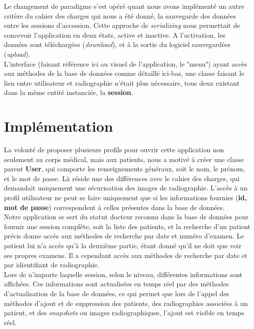 \documentclass[12pt,a4paper]{article}
\begin{document}
\begin{multicols}{2}
Le changement de paradigme s'est opéré quant nous avons implémenté un autre critère du cahier des charges qui nous a été donné, la sauvegarde des données entre les sessions d'accession. Cette approche de \textit{serializing} nous permettait de concevoir l'application en deux états, active et inactive. A l'activation, les données sont téléchargées (\textit{download}), et à la sortie du logiciel sauvegardées (\textit{upload}). \\
		
L'interface (faisant référence ici au visuel de l'application, le "menu") ayant accès aux méthodes de la base de données comme détaillé ici-bas, une classe faisant le lien entre utilisateur et radiographie n'était plus nécessaire, tous deux existant dans la même entité instanciée, la \textbf{session}.
		
\section{Implémentation}
		
La volonté de proposer plusieurs profils pour ouvrir cette application non seulement au corps médical, mais aux patients, nous a motivé à créer une classe parent \textbf{User}, qui comporte les renseignements généraux, soit le nom, le prénom, et le mot de passe. Là réside une des différences avec le cahier des charges, qui demandait uniquement une sécurisation des images de radiographie. L'accès à un profil utilisateur ne peut se faire uniquement que si les informations fournies (\textbf{id, mot de passe}) correspondent à celles présentes dans la base de données. \\
		
Notre application se sert du statut docteur reconnu dans la base de données pour fournir une session complète, soit la liste des patients, et la recherche d'un patient précis donne accès aux méthodes de recherche par date et numéro d'examen. Le patient lui n'a accès qu'à la deuxième partie, étant donné qu'il ne doit que voir ses propres examens. Il a cependant accès aux méthodes de recherche par date et par idientifiant de radiographie.\\
		
Lors de n'importe laquelle session, selon le niveau, différentes informations sont affichées. Ces informations sont actualisées en temps réel par des méthodes d'actualisation de la base de données, ce qui permet que lors de l'appel des méthodes d'ajout et de suppression des patients, des radiographies associées à un patient, et des \textit{snapshots} ou images radiographiques, l'ajout est visible en temps réel.\\
		

\end{multicols}
\end{document}
